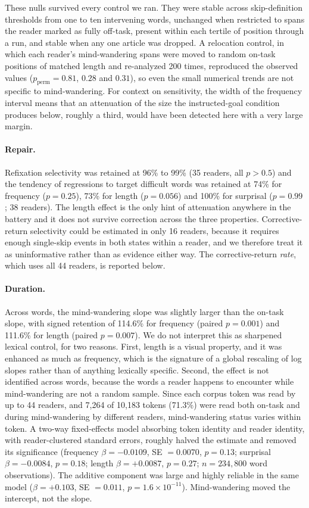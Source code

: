 \documentclass[11pt]{article}
\begin{document}
These nulls survived every control we ran. They were stable across skip-definition thresholds
from one to ten intervening words, unchanged when restricted to spans the reader marked as
fully off-task, present within each tertile of position through a run, and stable when any one
article was dropped. A relocation control, in which each reader's mind-wandering spans were
moved to random on-task positions of matched length and re-analyzed 200 times, reproduced the
observed values ($p_{\text{perm}}=0.81$, $0.28$ and $0.31$), so even the small numerical
trends are not specific to mind-wandering. For context on sensitivity, the width of the
frequency interval means that an attenuation of the size the instructed-goal condition produces
below, roughly a third, would have been detected here with a very large margin.

\paragraph{Repair.} Refixation selectivity was retained at 96\% to 99\% (35 readers, all
$p>0.5$) and the tendency of regressions to target difficult words was retained at 74\% for
frequency ($p=0.25$), 73\% for length ($p=0.056$) and 100\% for surprisal ($p=0.99$; 38
readers). The length effect is the only hint of attenuation anywhere in the battery and it does
not survive correction across the three properties. Corrective-return selectivity could be
estimated in only 16 readers, because it requires enough single-skip events in both states
within a reader, and we therefore treat it as uninformative rather than as evidence either way.
The corrective-return \emph{rate}, which uses all 44 readers, is reported below.

\paragraph{Duration.} Across words, the mind-wandering slope was slightly larger than the
on-task slope, with signed retention of 114.6\% for frequency (paired $p=0.001$) and 111.6\%
for length (paired $p=0.007$). We do not interpret this as sharpened lexical control, for two
reasons. First, length is a visual property, and it was enhanced as much as frequency, which
is the signature of a global rescaling of log slopes rather than of anything lexically
specific. Second, the effect is not identified across words, because the words a reader
happens to encounter while mind-wandering are not a random sample. Since each corpus token was
read by up to 44 readers, and 7{,}264 of 10{,}183 tokens (71.3\%) were read both on-task and
during mind-wandering by different readers, mind-wandering status varies within token. A
two-way fixed-effects model absorbing token identity and reader identity, with reader-clustered
standard errors, roughly halved the estimate and removed its significance (frequency
$\beta=-0.0109$, SE $=0.0070$, $p=0.13$; surprisal $\beta=-0.0084$, $p=0.18$; length
$\beta=+0.0087$, $p=0.27$; $n=234{,}800$ word observations). The additive component was large
and highly reliable in the same model ($\beta=+0.103$, SE $=0.011$, $p=1.6\times10^{-11}$).
Mind-wandering moved the intercept, not the slope.
\end{document}
